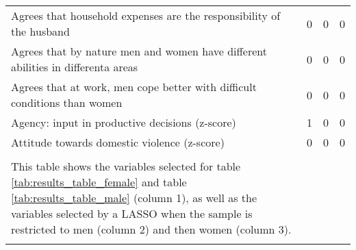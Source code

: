 \begin{longtable}{m{9cm}ccc}
Agrees that household expenses are the responsibility of the husband&0&0&0\\
Agrees that by nature men and women have different abilities in differenta areas&0&0&0\\
Agrees that at work, men cope better with difficult conditions than women&0&0&0\\
Agency: input in productive decisions (z-score)&1&0&0\\
Attitude towards domestic violence (z-score)&0&0&0\\
\midrule
\begin{minipage}{13cm}
\small{
{\textit Notes:} \\
This table shows the variables selected for table \ref{tab:results_table_female} and table \ref{tab:results_table_male} (column 1), as well as the variables selected by a LASSO when the sample is restricted to men (column 2) and then women (column 3). \\
}
\end{minipage} \\* \bottomrule
\end{longtable}
